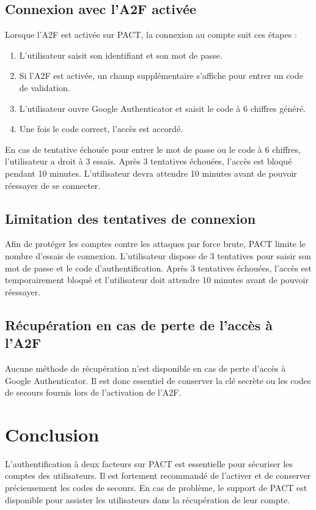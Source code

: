 \documentclass{article}
\begin{document}
\subsection{Connexion avec l'A2F activée}
Lorsque l'A2F est activée sur PACT, la connexion au compte suit ces étapes :
\begin{enumerate}
    \item L'utilisateur saisit son identifiant et son mot de passe.
    \item Si l'A2F est activée, un champ supplémentaire s'affiche pour entrer un code de validation.
    \item L'utilisateur ouvre Google Authenticator et saisit le code à 6 chiffres généré.
    \item Une fois le code correct, l'accès est accordé.
\end{enumerate}

En cas de tentative échouée pour entrer le mot de passe ou le code à 6 chiffres, l'utilisateur a droit à 3 essais. Après 3 tentatives échouées, l'accès est bloqué pendant 10 minutes. L'utilisateur devra attendre 10 minutes avant de pouvoir réessayer de se connecter.

\subsection{Limitation des tentatives de connexion}
Afin de protéger les comptes contre les attaques par force brute, PACT limite le nombre d'essais de connexion. L'utilisateur dispose de 3 tentatives pour saisir son mot de passe et le code d'authentification. Après 3 tentatives échouées, l'accès est temporairement bloqué et l'utilisateur doit attendre 10 minutes avant de pouvoir réessayer.

\subsection{Récupération en cas de perte de l'accès à l'A2F}
Aucune méthode de récupération n'est disponible en cas de perte d'accès à Google Authenticator. Il est donc essentiel de conserver la clé secrète ou les codes de secours fournis lors de l'activation de l'A2F.

\section{Conclusion}
L'authentification à deux facteurs sur PACT est essentielle pour sécuriser les comptes des utilisateurs. Il est fortement recommandé de l'activer et de conserver précieusement les codes de secours. En cas de problème, le support de PACT est disponible pour assister les utilisateurs dans la récupération de leur compte.
\end{document}
